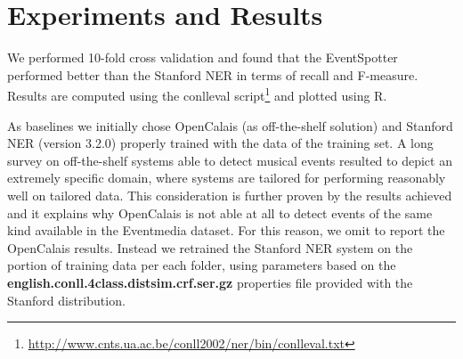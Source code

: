 \documentclass[10pt,a4paper]{article}
\begin{document}
\section{Experiments and Results}
We performed 10-fold cross validation and found that the EventSpotter performed better than the Stanford NER in terms of recall and F-measure. Results are computed using the conlleval script\footnote{\url{http://www.cnts.ua.ac.be/conll2002/ner/bin/conlleval.txt}} and plotted using R.

As baselines we initially chose OpenCalais (as off-the-shelf solution) and Stanford NER (version 3.2.0) properly trained with the data of the training set. 
A long survey on off-the-shelf systems able to detect musical events resulted to depict an extremely specific domain, where systems are tailored for performing reasonably well on tailored data. This consideration is further proven by the results achieved and it explains why OpenCalais is not able at all to detect events of the same kind available in the Eventmedia dataset. For this reason, we omit to report the OpenCalais results.
Instead we retrained the Stanford NER system on the portion of training data per each folder, using parameters based on the \textbf{english.conll.4class.distsim.crf.ser.gz} properties file provided with the Stanford distribution.
\end{document}

